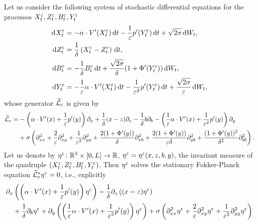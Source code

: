 \documentclass[10pt]{article}
\begin{document}
\begin{appendices}
	Let us consider the following system of stochastic differential equations for the processes $X_t^\varepsilon, Z_t^\varepsilon, B_t^\varepsilon, Y_t^\varepsilon$
	\begin{equation}
	\label{eq:systemSDEquadruple}
	\begin{aligned}
	\mathrm{d} X_t^\varepsilon &= -\alpha \cdot V'(X_t^\varepsilon) \,\mathrm{d} t - \frac1{\varepsilon} p'(Y_t^\varepsilon) \,\mathrm{d} t+ \sqrt{2\sigma} \,\mathrm{d} W_t, \\
	\mathrm{d} Z_t^\varepsilon &= \frac1\delta \left ( X^\varepsilon_t - Z^\varepsilon_t \right ) \,\mathrm{d} t, \\
	\mathrm{d} B_t^\varepsilon &= - \frac1\delta B_t^\varepsilon \,\mathrm{d} t + \frac{\sqrt{2\sigma}}{\delta}(1+\Phi'(Y_t^\varepsilon)) \,\mathrm{d} W_t, \\
	\mathrm{d} Y_t^\varepsilon &= -\frac1{\varepsilon} \alpha \cdot V'(X_t^\varepsilon) \,\mathrm{d} t - \frac{1}{\varepsilon^2} p'(Y_t^\varepsilon) \,\mathrm{d} t+ \frac{\sqrt{2\sigma}}{\varepsilon} \,\mathrm{d} W_t,
	\end{aligned}
	\end{equation}
	whose generator $\widetilde{\mathcal L}_\varepsilon$ is given by
	\begin{equation}
	\begin{aligned}
	\widetilde{\mathcal L}_\varepsilon =& -\left( \alpha \cdot V'(x) + \frac1{\varepsilon} p'(y) \right) \partial_x + \frac1\delta (x-z) \partial_z - \frac1\delta b \partial_b - \left( \frac1{\varepsilon} \alpha \cdot V'(x) + \frac{1}{\varepsilon^2} p'(y) \right) \partial_y \\
	& + \sigma \left( \partial_{xx}^2 + \frac2{\varepsilon} \partial_{xy}^2 + \frac{1}{\varepsilon^2} \partial_{yy}^2 + \frac{2(1+\Phi'(y))}{\delta} \partial_{xb}^2 + \frac{2(1+\Phi'(y))}{\varepsilon \delta} \partial_{yb}^2 + \frac{(1+\Phi'(y))^2}{\delta^2} \partial_{bb}^2 \right).
	\end{aligned}
	\end{equation}
	Let us denote by $\eta^\varepsilon \colon \mathbb{R}^3 \times [0,L] \to \mathbb{R}$, $\eta^\varepsilon = \eta^\varepsilon(x,z,b,y)$, the invariant measure of the quadruple $(X_t^\varepsilon, Z_t^\varepsilon, B_t^\varepsilon, Y_t^\varepsilon)$. Then $\eta^\varepsilon$ solves the stationary Fokker-Planck equation $\widetilde{\mathcal L}_\varepsilon^* \eta^\varepsilon = 0$, i.e., explicitly
	\begin{equation} \label{eq:FPSDEquadruple}
	\begin{aligned}
	&\partial_x \left( \left( \alpha \cdot V'(x) + \frac1\epl p'(y) \right) \eta^\epl \right) - \frac1\delta\partial_z \left( (x-z) \eta^\epl \right) \\
	&\quad + \frac1\delta \partial_b \eta^\epl  + \partial_y \left( \left( \frac1\epl \alpha \cdot V'(x) + \frac{1}{\epl^2} p'(y) \right) \eta^\epl \right) + \sigma \left( \partial_{xx}^2 \eta^\epl + \frac2\epl \partial_{xy}^2 \eta^\epl + \frac1{\epl^2} \partial_{yy}^2 \eta^\epl \right) \\

\end{aligned}
\end{equation}
\end{appendices}
\end{document}
